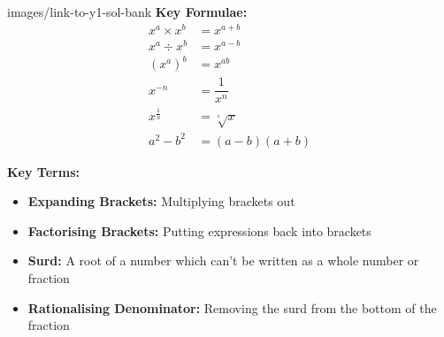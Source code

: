\documentclass[fleqn]{article}
\begin{document}





\begin{keyinformation}{images/link-to-y1-sol-bank}
    \textbf{Key Formulae:}
    \begin{align*}
        x^a \times x^b &= x^{a+b}                    \\
        x^a \div x^b &= x^{a-b}                      \\
        (x^a)^b &= x^{ab}                            \\
        x^{-n} &= \dfrac{1}{x^n}                     \\
        x^{\tfrac{1}{n}} &= \sqrt[\textstyle{^n}]{x} \\
        a^2 - b^2 &= (a-b)(a+b)
    \end{align*}

    \textbf{Key Terms:}
    \begin{itemize}
        \item \textbf{Expanding Brackets:} Multiplying brackets out
        \item \textbf{Factorising Brackets:} Putting expressions back into brackets
        \item \textbf{Surd:} A root of a number which can't be written as a whole number or fraction
        \item \textbf{Rationalising Denominator:} Removing the surd from the bottom of the fraction
    \end{itemize}
\end{keyinformation}



\newpage
\pagestyle{attribution}
\end{document}
